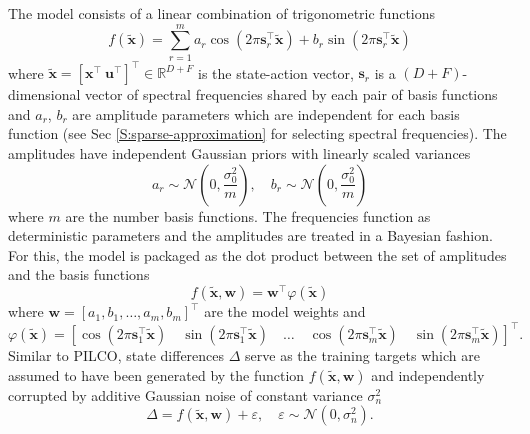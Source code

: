 The model consists of a linear combination of trigonometric functions \citep{quia2010sparse}
\begin{equation}
    f(\tilde{\mathbf{x}})=\sum_{r=1}^{m} a_{r} \cos \left(2 \pi \mathbf{s}_{r}^{\top} \tilde{\mathbf{x}}\right)+b_{r} \sin \left(2 \pi \mathbf{s}_{r}^{\top} \tilde{\mathbf{x}}\right)
    \label{Eq:Model-trigonometric-model}
\end{equation}
where $\tilde{\mathbf{x}}=\left[\mathbf{x}^{\top} \ \mathbf{u}^{\top}\right]^{\top}\in\mathbb{R}^{D+F}$ is the state-action vector, $\mathbf{s}_{r}$ is a $(D+F)$-dimensional vector of spectral frequencies shared by each pair of basis functions and $a_{r}$, $b_{r}$ are amplitude parameters which are independent for each basis function (see Sec \ref{S:sparse-approximation} for selecting spectral frequencies). The amplitudes have independent Gaussian priors with linearly scaled variances 
\begin{equation}
    a_{r} \sim \mathcal{N}\left(0, \frac{\sigma_{0}^{2}}{m}\right), \quad b_{r} \sim \mathcal{N}\left(0, \frac{\sigma_{0}^{2}}{m}\right)
\end{equation}
where $m$ are the number basis functions. The frequencies function as deterministic parameters and the amplitudes are treated in a Bayesian fashion. For this, the model is packaged as the dot product between the set of amplitudes and the basis functions 
\begin{equation}
    f(\tilde{\mathbf{x}}, \mathbf{w}) = \mathbf{w}^{\top} \varphi\left(\tilde{\mathbf{x}}\right)
\end{equation}
where $\mathbf{w}=\left[a_{1}, b_{1}, \dots, a_{m}, b_{m}\right]^{\top}$ are the model weights and
\begin{equation}
    \varphi(\tilde{\mathbf{x}})=\left[\cos \left(2 \pi \mathbf{s}_{1}^{\top} \tilde{\mathbf{x}}\right)\quad \sin \left(2 \pi \mathbf{s}_{1}^{\top} \tilde{\mathbf{x}}\right) \quad\ldots\quad \cos \left(2 \pi \mathbf{s}_{m}^{\top} \tilde{\mathbf{x}}\right) \quad \sin \left(2 \pi \mathbf{s}_{m}^{\top} \tilde{\mathbf{x}}\right)\right]^{\top}.
\end{equation}
Similar to PILCO, state differences $\Delta$ serve as the training targets which are assumed to have been generated by the function $f(\tilde{\mathbf{x}}, \mathbf{w})$ and independently corrupted by additive Gaussian noise of constant variance $\sigma_{n}^{2}$
\begin{equation}
    \Delta = f(\tilde{\mathbf{x}}, \mathbf{w}) + \varepsilon, \quad \varepsilon \sim \mathcal{N}\left(0,\sigma_{n}^{2}\right).
\end{equation}
